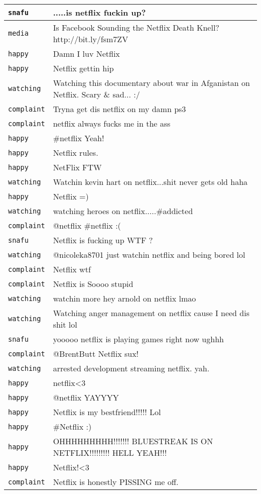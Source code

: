 {\begin{longtable}{|l|p{160mm}|}
      \tabularnewline\hline
         \texttt{snafu} & .....is netflix fuckin up?
      \tabularnewline\hline
         \texttt{media} & Is Facebook Sounding the Netflix Death Knell? http://bit.ly/fsm7ZV
      \tabularnewline\hline
         \texttt{happy} & Damn I luv Netflix
      \tabularnewline\hline
         \texttt{happy} & Netflix gettin hip
      \tabularnewline\hline
         \texttt{watching} & Watching this documentary about war in Afganistan on Netflix. Scary \& sad... :/
      \tabularnewline\hline
         \texttt{complaint} & Tryna get dis netflix on my damn ps3
      \tabularnewline\hline
         \texttt{complaint} & netflix always fucks me in the ass
      \tabularnewline\hline
         \texttt{happy} & \#netflix Yeah!
      \tabularnewline\hline
         \texttt{happy} & Netflix rules.
      \tabularnewline\hline
         \texttt{happy} & NetFlix FTW
      \tabularnewline\hline
         \texttt{watching} & Watchin kevin hart on netflix...shit never gets old haha
      \tabularnewline\hline
         \texttt{happy} & Netflix =)
      \tabularnewline\hline
         \texttt{watching} & watching heroes on netflix.....\#addicted
      \tabularnewline\hline
         \texttt{complaint} & @netflix \#netflix :(
      \tabularnewline\hline
         \texttt{snafu} & Netflix is fucking up WTF ?
      \tabularnewline\hline
         \texttt{watching} & @nicoleka8701 just watchin netflix and being bored lol
      \tabularnewline\hline
         \texttt{complaint} & Netflix wtf
      \tabularnewline\hline
         \texttt{complaint} & Netflix is Soooo stupid
      \tabularnewline\hline
         \texttt{watching} & watchin more hey arnold on netflix lmao
      \tabularnewline\hline
         \texttt{watching} & Watching anger management on netflix cause I need dis shit lol
      \tabularnewline\hline
         \texttt{snafu} & yooooo netflix is playing games right now ughhh
      \tabularnewline\hline
         \texttt{complaint} & @BrentButt Netflix sux!
      \tabularnewline\hline
         \texttt{watching} & arrested development streaming netflix. yah.
      \tabularnewline\hline
         \texttt{happy} & netflix<3
      \tabularnewline\hline
         \texttt{happy} & @netflix YAYYYY
      \tabularnewline\hline
         \texttt{happy} & Netflix is my bestfriend!!!!! Lol
      \tabularnewline\hline
         \texttt{happy} & \#Netflix :)
      \tabularnewline\hline
         \texttt{happy} & OHHHHHHHHH!!!!!!! BLUESTREAK IS ON NETFLIX!!!!!!!!! HELL YEAH!!!
      \tabularnewline\hline
         \texttt{happy} & Netflix!<3
      \tabularnewline\hline
         \texttt{complaint} & Netflix is honestly PISSING me off.

\end{longtable}}

